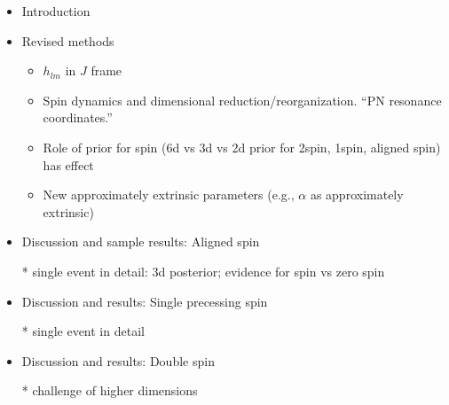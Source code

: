 \begin{itemize}

  \item Introduction
  \item Revised methods
    \begin{itemize}
        \item  $h_{lm}$ in $J$ frame
        \item Spin dynamics and dimensional reduction/reorganization.  ``PN resonance coordinates.''
        \item Role of prior for spin (6d vs 3d vs 2d prior for 2spin, 1spin, aligned spin) has effect
        \item New approximately extrinsic parameters (e.g., $\alpha$ as approximately extrinsic)
    \end{itemize}

 \item Discussion and sample results: Aligned spin
     
   * single event in detail: 3d posterior; evidence for spin vs zero spin

 \item Discussion and results: Single precessing spin



   * single event in detail

 \item Discussion and results: Double spin

  * challenge of higher dimensions
\end{itemize}
